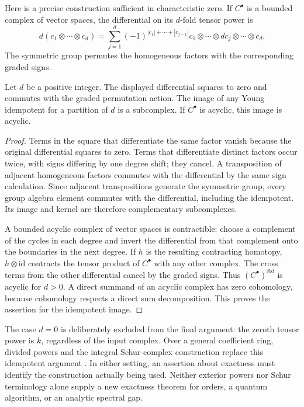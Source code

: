 Here is a precise construction sufficient in characteristic
zero.  If \(C^\bullet\) is a bounded complex of vector spaces,
the differential on its \(d\)-fold tensor power is
\[
 d(c_1\otimes\cdots\otimes c_d)
 =\sum_{j=1}^d
 (-1)^{|c_1|+\cdots+|c_{j-1}|}
 c_1\otimes\cdots\otimes dc_j\otimes\cdots\otimes c_d.
\]
The symmetric group permutes the homogeneous factors with
the corresponding graded signs.

\begin{proposition}
Let \(d\) be a positive integer.  The displayed differential
squares to zero and commutes with
the graded permutation action.  The image of any Young
idempotent for a partition of \(d\) is a subcomplex.
If \(C^\bullet\) is acyclic, this image is acyclic.
\end{proposition}
\begin{proof}
Terms in the square that differentiate the same factor vanish
because the original differential squares to zero.  Terms
that differentiate distinct factors occur twice, with signs
differing by one degree shift; they cancel.  A transposition
of adjacent homogeneous factors commutes with the differential
by the same sign calculation.  Since adjacent transpositions
generate the symmetric group, every group algebra element
commutes with the differential, including the idempotent.
Its image and kernel are therefore complementary subcomplexes.

A bounded acyclic complex of vector spaces is contractible:
choose a complement of the cycles in each degree and invert
the differential from that complement onto the boundaries in
the next degree.  If \(h\) is the resulting contracting
homotopy, \(h\otimes\mathrm{id}\) contracts the tensor product
of \(C^\bullet\) with any other complex.  The cross terms
from the other differential cancel by the graded signs.
Thus \((C^\bullet)^{\otimes d}\) is acyclic for \(d>0\).
A direct summand of an acyclic complex has zero cohomology,
because cohomology respects a direct sum decomposition.
This proves the assertion for the idempotent image.
\end{proof}

The case \(d=0\) is deliberately excluded from the final
argument: the zeroth tensor power is \(k\), regardless of
the input complex.  Over a general coefficient ring,
divided powers and the integral Schur-complex construction
replace this idempotent argument \cite{smtABW1982}.  In either
setting, an assertion about exactness must identify the
construction actually being used.  Neither exterior powers
nor Schur terminology alone supply a new exactness theorem
for orders, a quantum algorithm, or an analytic spectral gap.

